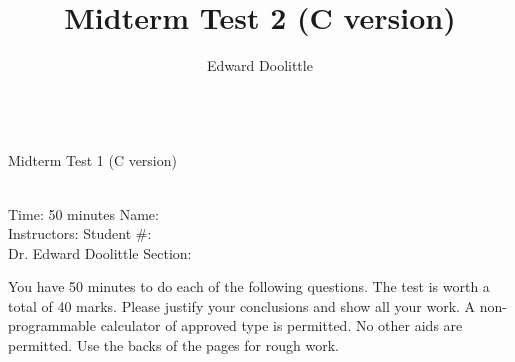 \documentclass[12pt]{article}
\title{Midterm Test 2 (C version)}
\author{Edward Doolittle}
\begin{document}
\thispagestyle{plain}

\begin{center}
  \quad\\
  \LARGE{Midterm Test 1 (C version)}
\end{center}

\begin{flushleft}
\quad\\
Time: 50 minutes                \hfill       Name: \underline{\hspace{2in}}  \\
Instructors:                    \hfill Student \#: \underline{\hspace{2in}}  \\
\quad Dr. Edward Doolittle      \hfill    Section: \underline{\hspace{2in}}  \\
\end{flushleft}


\noindent
You have 50 minutes to do each of the following questions.
The test is worth a total of 40 marks.
Please justify your conclusions and
show all your work.
A non-programmable calculator of approved type is permitted.  No other aids
are permitted.
Use the backs of the pages for rough work.
\end{document}
